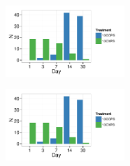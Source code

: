 \begin{figure}[H]
	\begin{center}
		\centerline{\includegraphics[width=0.40\textwidth]{figures/all_rspndr_bar/all_rspndr_bar.pdf}}
	\caption{\protect}\label{fig:rspndr_count}
        \end{center}
\end{figure}


\begin{figure}[H]
	\begin{center}
		\centerline{\includegraphics[width=0.40\textwidth]{figures/all_rspndr_bar/all_rspndr_bar.pdf}}
	\caption{\protect}\label{fig:rspndr_count}
        \end{center}
\end{figure}




